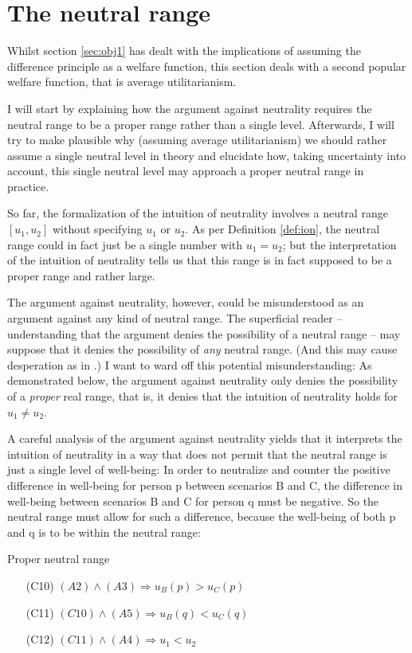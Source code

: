 \section{The neutral range}
\label{sec:obj2}

Whilst section \ref{sec:obj1} has dealt with the implications of assuming the difference principle as a welfare function, this section deals with a second popular welfare function, that is average utilitarianism. 

I will start by explaining how the argument against neutrality requires the neutral range to be a proper range rather than a single level. Afterwards, I will try to make plausible why (assuming average utilitarianism) we should rather assume a single neutral level in theory and elucidate how, taking uncertainty into account, this single neutral level may approach a proper neutral range in practice.  

So far, the formalization of the intuition of neutrality involves a neutral range $[u_1, u_2]$ without specifying $u_1$ or $u_2$. As per Definition \ref{def:ion}, the neutral range could in fact just be a single number with $u_1 = u_2$; but the interpretation of the intuition of neutrality tells us that this range is in fact supposed to be a proper range and rather large. 

The argument against neutrality, however, could be misunderstood as an argument against any kind of neutral range. The superficial reader -- understanding that the argument denies the possibility of a neutral range -- may suppose that it denies the possibility of \emph{any} neutral range. (And this may cause desperation as in .) I want to ward off this potential misunderstanding: As demonstrated below, the argument against neutrality only denies the possibility of a \emph{proper} real range, that is, it denies that the intuition of neutrality holds for $u_1 \neq u_2$. 

A careful analysis of the argument against neutrality yields that it interprets the intuition of neutrality in a way that does not permit that the neutral range is just a single level of well-being: In order to neutralize and counter the positive difference in well-being for person p between scenarios B and C, the difference in well-being between scenarios B and C for person q must be negative. So the neutral range must allow for such a difference, because the well-being of both p and q is to be within the neutral range:

\begin{Corollary}{Proper neutral range}{}
\begin{enumerate}
\item[(C10)] \hspace{1cm} $(A2)  \wedge (A3) \Rightarrow u_B(p) > u_C(p)$
\item[(C11)] \hspace{1cm} $(C10) \wedge (A5) \Rightarrow u_B(q) < u_C(q)$
\item[(C12)] \hspace{1cm} $(C11) \wedge (A4) \Rightarrow u_1 < u_2$
\end{enumerate}
\end{Corollary}

